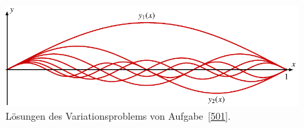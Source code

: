 %
%
%
\begin{figure}
\centering
\includegraphics{chapters/050-nebenbedingungen/images/yk.pdf}
\caption{Lösungen des Variationsproblems von Aufgabe~\ref{501}.
\label{buch:nebenbedingungen:aufgabe:501:fig:yk}}
\end{figure}
